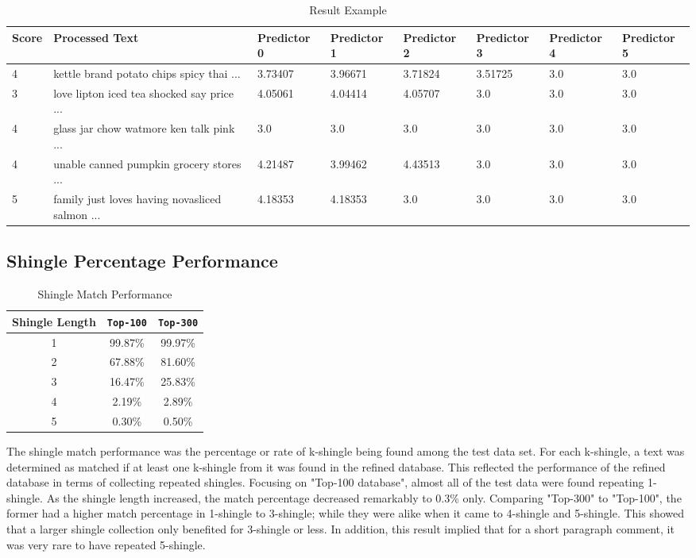 \begin{table*}
	\caption{Result Example}
	\label{tab:commands}
	\begin{tabular}{llllllll}
	\toprule
	Score &	Processed Text & Predictor 0 & Predictor 1 & Predictor 2 &	Predictor 3 & Predictor 4 & Predictor 5 \\
	\midrule
	4	& kettle brand potato chips spicy thai ...& 3.73407	 &3.96671	&3.71824	 & 3.51725&3.0 & 3.0\\
	3&love lipton iced tea shocked say price ... &	4.05061 	& 4.04414	&4.05707&	3.0&	3.0	&3.0\\
	4&glass jar chow watmore ken talk pink ...&	3.0 &	3.0	&3.0	&3.0	&3.0	 &3.0\\
	4 &unable canned pumpkin grocery stores ...	& 4.21487 &	3.99462	& 4.43513	 & 3.0	& 3.0	&3.0\\
	5&family just loves having novasliced salmon ...&	4.18353	&4.18353	&3.0	&3.0	&3.0	&3.0\\

	\bottomrule
\end{tabular}
\end{table*}

\subsection{Shingle Percentage Performance}

\begin{table}[H]
\caption{Shingle Match Performance}
		\begin{tabular}{ccc}
			\toprule
				Shingle Length & \texttt{Top-100} & \texttt{Top-300} \\
			\midrule
				1 & 99.87\% & 99.97\% \\
				2 & 67.88\% & 81.60\% \\
				3 & 16.47\% & 25.83\% \\
				4 & 2.19\%  & 2.89\% \\
				5 & 0.30\%  & 0.50\% \\
			\bottomrule
		\end{tabular}
\end{table}

The shingle match performance was the percentage or rate of k-shingle being found among the test data set. 
For each k-shingle, a text was determined as matched if at least one k-shingle from it was found in the refined database. 
This reflected the performance of the refined database in terms of collecting repeated shingles. 
Focusing on "Top-100 database", almost all of the test data were found repeating 1-shingle. As the shingle length increased, the match percentage decreased remarkably to 0.3\% only. 
Comparing "Top-300" to "Top-100", the former had a higher match percentage in 1-shingle to 3-shingle; while they were alike when it came to 4-shingle and 5-shingle.
This showed that a larger shingle collection only benefited for 3-shingle or less. In addition, this result implied that for a short paragraph comment, it was very rare to have repeated 5-shingle. 

